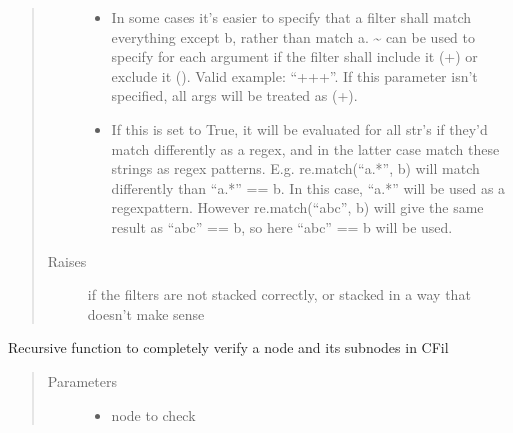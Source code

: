 \documentclass[a4paper,10pt,english]{sphinxmanual}
\begin{document}
\begin{fulllineitems}
\begin{fulllineitems}
\begin{quote}
\begin{description}
\begin{itemize}
\item {}
\sphinxAtStartPar
{} \textendash{} In some cases it’s easier to specify that a filter shall match everything except b, rather than
match a. \textasciitilde{} can be used to specify for each argument if the filter shall include it (+) or exclude it
(\sphinxhyphen{}). Valid example: “++\sphinxhyphen{}+”. If this parameter isn’t specified, all args will be treated as (+).

\item {}
\sphinxAtStartPar
{} \textendash{} If this is set to True, it will be evaluated for all str’s if they’d match differently as a
regex, and in the latter case match these strings as regex patterns. E.g. re.match(“a.*”, b) will match
differently than “a.*” == b. In this case, “a.*” will be used as a regex\sphinxhyphen{}pattern. However
re.match(“abc”, b) will give the same result as “abc” == b, so here “abc” == b will be used.

\end{itemize}

\item[{Raises}] \leavevmode
\sphinxAtStartPar
{} \textendash{} if the filters are not stacked correctly, or stacked in a way that doesn’t make sense

\end{description}\end{quote}

\end{fulllineitems}


\begin{fulllineitems}
\label{\detokenize{fagus:fagus.CFil.match_node}}
\pysigstartsignatures
{}
\pysigstopsignatures
\sphinxAtStartPar
Recursive function to completely verify a node and its subnodes in CFil
\begin{quote}\begin{description}
\item[{Parameters}] \leavevmode\begin{itemize}
\item {}
\sphinxAtStartPar
{} \textendash{} node to check


\end{itemize}
\end{description}
\end{quote}
\end{fulllineitems}
\end{fulllineitems}
\end{document}
